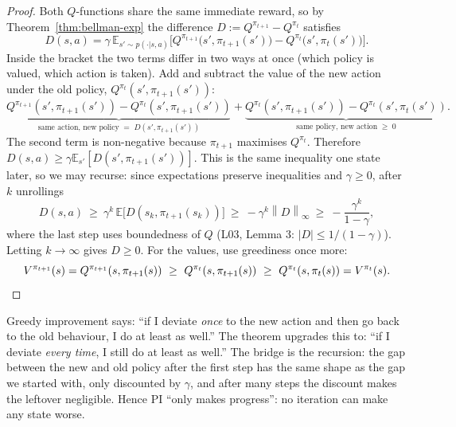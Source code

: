 \documentclass[11pt,a4paper]{article}
\newcommand{\E}{\mathbb{E}}
\newcommand{\norm}[1]{\left\lVert #1\right\rVert_\infty}
\theoremstyle{plain}
\theoremstyle{definition}
\theoremstyle{remark}
\begin{document}
\begin{proof}
Both $Q$-functions share the same immediate reward, so by Theorem~\ref{thm:bellman-exp} the difference $D:=Q^{\pi_{t+1}}-Q^{\pi_t}$ satisfies
\[
D(s,a)=\gamma\,\E_{s'\sim p(\cdot|s,a)}\Big[Q^{\pi_{t+1}}\big(s',\pi_{t+1}(s')\big)-Q^{\pi_t}\big(s',\pi_t(s')\big)\Big].
\]
Inside the bracket the two terms differ in two ways at once (which policy is valued, which action is taken). Add and subtract the value of the new action under the old policy, $Q^{\pi_t}(s',\pi_{t+1}(s'))$:
\[
\underbrace{Q^{\pi_{t+1}}(s',\pi_{t+1}(s'))-Q^{\pi_t}(s',\pi_{t+1}(s'))}_{\text{same action, new policy}\;=\;D(s',\pi_{t+1}(s'))}
+\underbrace{Q^{\pi_t}(s',\pi_{t+1}(s'))-Q^{\pi_t}(s',\pi_t(s'))}_{\text{same policy, new action}\;\ge\;0}.
\]
The second term is non-negative because $\pi_{t+1}$ maximises $Q^{\pi_t}$. Therefore $D(s,a)\ge\gamma\E_{s'}[D(s',\pi_{t+1}(s'))]$. This is the same inequality one state later, so we may recurse: since expectations preserve inequalities and $\gamma\ge0$, after $k$ unrollings
\[
D(s,a)\ \ge\ \gamma^k\,\E\big[D(s_k,\pi_{t+1}(s_k))\big]\ \ge\ -\gamma^k\norm{D}\ \ge\ -\frac{\gamma^k}{1-\gamma},
\]
where the last step uses boundedness of $Q$ (L03, Lemma 3: $|D|\le1/(1-\gamma)$). Letting $k\to\infty$ gives $D\ge0$. For the values, use greediness once more:
\[
V^{\pi_{t+1}}(s)=Q^{\pi_{t+1}}(s,\pi_{t+1}(s))\ \ge\ Q^{\pi_t}(s,\pi_{t+1}(s))\ \ge\ Q^{\pi_t}(s,\pi_t(s))=V^{\pi_t}(s).\qedhere
\]
\end{proof}

\begin{intuition}
Greedy improvement says: ``if I deviate \emph{once} to the new action and then go back to the old behaviour, I do at least as well.'' The theorem upgrades this to: ``if I deviate \emph{every time}, I still do at least as well.'' The bridge is the recursion: the gap between the new and old policy after the first step has the same shape as the gap we started with, only discounted by $\gamma$, and after many steps the discount makes the leftover negligible. Hence PI ``only makes progress'': no iteration can make any state worse.
\end{intuition}
\end{document}

